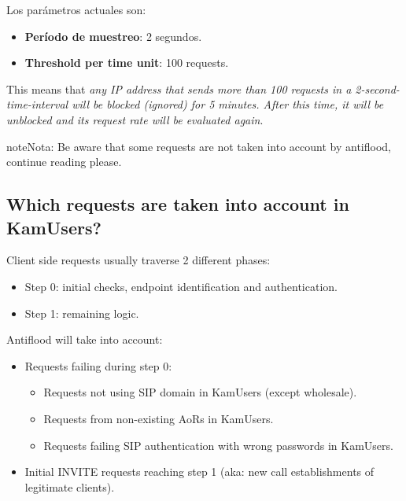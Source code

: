 \documentclass[letterpaper,10pt,spanish]{sphinxmanual}
\begin{document}
Los parámetros actuales son:
\begin{itemize}
\item {} 
\textbf{Período de muestreo}: 2 segundos.

\item {} 
\textbf{Threshold per time unit}: 100 requests.

\end{itemize}

This means that \emph{any IP address that sends more than 100 requests in a 2-second-time-interval will be blocked (ignored)
for 5 minutes. After this time, it will be unblocked and its request rate will be evaluated again}.

\begin{notice}{note}{Nota:}
Be aware that some requests are not taken into account by antiflood, continue reading please.
\end{notice}


\subsection{Which requests are taken into account in KamUsers?}
\label{security_and_maintenance/security/antiflooding:which-requests-are-taken-into-account-in-kamusers}
Client side requests usually traverse 2 different phases:
\begin{itemize}
\item {} 
Step 0: initial checks, endpoint identification and authentication.

\item {} 
Step 1: remaining logic.

\end{itemize}

Antiflood will take into account:
\begin{itemize}
\item {} 
Requests failing during step 0:
\begin{itemize}
\item {} 
Requests not using SIP domain in KamUsers (except wholesale).

\item {} 
Requests from non-existing AoRs in KamUsers.

\item {} 
Requests failing SIP authentication with wrong passwords in KamUsers.

\end{itemize}

\item {} 
Initial INVITE requests reaching step 1 (aka: new call establishments of legitimate clients).

\end{itemize}
\end{document}
